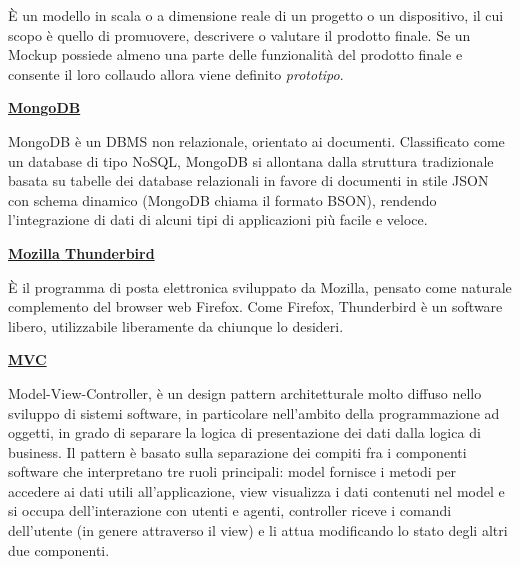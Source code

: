 \medskip
\begin{addmargin}[5em]{1em}	
È un modello in scala o a dimensione reale di un progetto o un dispositivo, il cui scopo è quello di promuovere, descrivere o valutare il prodotto finale. Se un Mockup possiede almeno una parte delle funzionalità del prodotto finale e consente il loro collaudo allora viene definito \textit{prototipo}.
\end{addmargin}	

\bigskip
\begin{addmargin}[0em]{0em}	
	\textbf{\underline{MongoDB}} 
\end{addmargin}
	
\medskip
\begin{addmargin}[5em]{1em}	
MongoDB è un DBMS non relazionale, orientato ai documenti. Classificato come un database di tipo NoSQL, MongoDB si allontana dalla struttura tradizionale basata su tabelle dei database relazionali in favore di documenti in stile JSON con schema dinamico (MongoDB chiama il formato BSON), rendendo l'integrazione di dati di alcuni tipi di applicazioni più facile e veloce. 
\end{addmargin}	

\bigskip
\begin{addmargin}[0em]{0em}	
	\textbf{\underline{Mozilla Thunderbird}} 
\end{addmargin}

\medskip
\begin{addmargin}[5em]{1em}	
È il programma di posta elettronica sviluppato da Mozilla, pensato come naturale complemento del browser web Firefox. 
Come Firefox, Thunderbird è un software libero, utilizzabile liberamente da chiunque lo desideri.
\end{addmargin}	

\bigskip
\begin{addmargin}[0em]{0em}	
	\textbf{\underline{MVC}} 
\end{addmargin}

\medskip
\begin{addmargin}[5em]{1em}	
Model-View-Controller, è un design pattern architetturale molto diffuso nello sviluppo di sistemi software, in particolare nell'ambito della programmazione ad oggetti, in grado di separare la logica di presentazione dei dati dalla logica di business. Il pattern è basato sulla separazione dei compiti fra i componenti software che interpretano tre ruoli principali: model fornisce i metodi per accedere ai dati utili all'applicazione, view visualizza i dati contenuti nel model e si occupa dell'interazione con utenti e agenti, controller riceve i comandi dell'utente (in genere attraverso il view) e li attua modificando lo stato degli altri due componenti.
\end{addmargin}	

